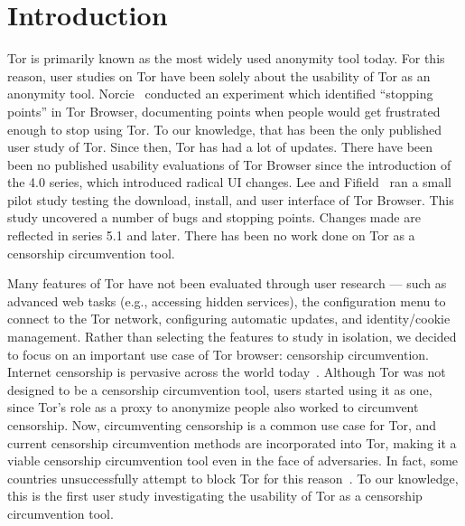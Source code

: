 \documentclass[USenglish,oneside,twocolumn]{article}
\begin{document}


\maketitle

\section{Introduction}
Tor is primarily known as the most widely used anonymity tool today. 
For this reason, user studies on Tor have been solely about the usability of Tor as an
anonymity tool. Norcie~\cite{norcie2012eliminating} conducted an experiment which identified 
``stopping points'' in Tor Browser, documenting points when people would get frustrated enough
to stop using Tor. To our knowledge, that has been the only published user study of Tor. 
Since then, Tor has had a lot of updates. There have been been no published usability evaluations of
Tor Browser since the introduction of the 4.0 series, which introduced radical UI changes. 
Lee and Fifield~\cite {uxsprint} ran a small pilot study testing the download, install, and user interface of Tor Browser. 
This study uncovered a number of bugs and stopping points. Changes made are reflected in series 
5.1 and later. There has been no work done on Tor as a censorship circumvention tool. 

Many features of Tor have not been evaluated through user
research --- such as advanced web tasks (e.g., accessing hidden services), the
configuration menu to connect to the Tor network, configuring automatic
updates, and identity/cookie management. Rather than selecting the features to
study in isolation, we decided to focus on an important use case of Tor browser: censorship circumvention. 
Internet censorship is pervasive across the world today~\cite{faris2008measuring}. 
Although Tor was not designed to be a censorship circumvention tool, users started
using it as one, since Tor's role as a proxy to anonymize
people also worked to circumvent censorship. Now, circumventing censorship is a
common use case for Tor, and current censorship circumvention methods are
incorporated into Tor, making it a viable censorship circumvention tool even in the face
of adversaries. In fact, some countries unsuccessfully attempt to block Tor for this reason~\cite{winter2012great}. 
To our knowledge, this is the first user study investigating the usability of Tor as a 
censorship circumvention tool.
\end{document}
